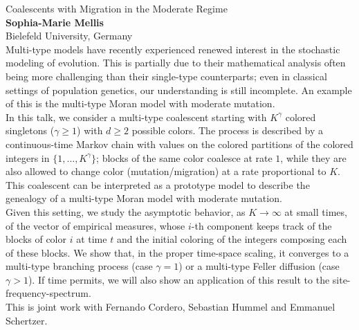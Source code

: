 \documentclass[12pt,a4paper]{article}
\begin{document}
\noindent
{\Large Coalescents with Migration in the Moderate Regime}\\[1ex]
{\large 
\textbf{Sophia-Marie Mellis}\\[1ex] Bielefeld University, Germany}\\[2ex]
Multi-type models have recently experienced renewed interest in the stochastic modeling of evolution. This is partially due to their mathematical analysis often being more challenging than their single-type counterparts; even in classical settings of population genetics, our understanding is still incomplete. An example of this is the multi-type Moran model with moderate mutation.
\\
In this talk, we consider a multi-type coalescent starting with $K^{\gamma}$ colored singletons ($\gamma \geq 1$) with $d \geq 2$ possible colors. The process is described by a continuous-time Markov chain with values on the colored partitions of the colored integers in $\{1, \ldots, K^{\gamma}\}$; blocks of the same color coalesce at rate $1$, while they are also allowed to change color (mutation/migration) at a rate proportional to $K$. This coalescent can be interpreted as a prototype model to describe the genealogy of a multi-type Moran model with moderate mutation.
\\
Given this setting, we study the asymptotic behavior, as $K\to\infty$ at small times, of the vector of empirical measures, whose $i$-th component keeps track of the blocks of color $i$ at time $t$ and the initial coloring of the integers composing each of these blocks. We show that, in the proper time-space scaling, it converges to a multi-type branching process (case $\gamma = 1$) or a multi-type Feller diffusion (case $\gamma > 1$). If time permits, we will also show an application of this result to the site-frequency-spectrum.
\\
This is joint work with Fernando Cordero, Sebastian Hummel and Emmanuel Schertzer. 

\bigskip \bigskip  %
\end{document}
